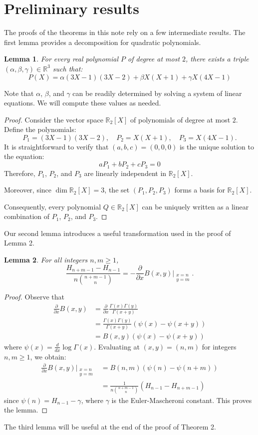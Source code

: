 \documentclass[10pt,a4paper]{amsart}
\numberwithin{equation}{section}
\newtheorem{lemma}{Lemma}
\newcommand{\R}{\mathbb R}
\begin{document}
\section{Preliminary results}
The proofs of the theorems in this note rely on a few intermediate results. The first lemma provides a decomposition for quadratic polynomials.
\begin{lemma}
    For every real polynomial $P$ of degree at most $2$, there exists a triple $(\alpha,\beta,\gamma)\in\R^3$ such that:
    \[P(X)=\alpha (3X-1)(3X-2)+\beta X(X+1)+\gamma X(4X-1)\]
\end{lemma}
Note that $\alpha$, $\beta$, and $\gamma$ can be readily determined by solving a system of linear equations. We will compute these values as needed. 
\begin{proof}
    Consider the vector space $\R_2[X]$ of polynomials of degree at most $2$. Define the polynomials:
    \[P_1=(3X-1)(3X-2),\quad P_2=X(X+1),\quad P_3=X(4X-1).\]
    It is straightforward to verify that $(a,b,c)=(0,0,0)$ is the unique solution to the equation:
    \[aP_1+bP_2+cP_3=0\]
    Therefore, $P_1$, $P_2$, and $P_3$ are linearly independent in $\R_2[X]$.
    
    Moreover, since $\dim\R_2[X]=3$, the set $(P_1,P_2,P_3)$ forms a basis for $\R_2[X]$. 

    Consequently, every polynomial $Q\in\R_2[X]$ can be uniquely written as a linear combination of $P_1$, $P_2$, and $P_3$.
\end{proof}
Our second lemma introduces a useful transformation used in the proof of Lemma 2.
\begin{lemma}
    For all integers $n,m\ge1$, 
    \begin{equation}
     \frac{H_{n+m-1}-H_{n-1}}{n\binom{n+m-1}{n}}=-\frac{\partial}{\partial x}B(x,y)\Bigg|_{\substack{x=n\\y=m}}.
    \label{lem2}
    \end{equation}
\end{lemma}
\begin{proof}
    Observe that
    \begin{align*}
        \frac{\partial}{\partial x}B(x,y)&=\frac{\partial}{\partial x}\frac{\Gamma(x)\Gamma(y)}{\Gamma(x+y)}\\&=\frac{\Gamma(x)\Gamma(y)}{\Gamma(x+y)}(\psi(x)-\psi(x+y))\\&=B(x,y)(\psi(x)-\psi(x+y))
    \end{align*}
    where $\psi(x)=\frac{d}{dx}\log{\Gamma(x)}$. Evaluating at $(x,y)=(n,m)$ for integers $n,m\ge1$, we obtain:
    \begin{align*}
        \frac{\partial}{\partial x}B(x,y)\Bigg|_{\substack{x=n\\y=m}}&=B(n,m)(\psi(n)-\psi(n+m))\\&=\frac{1}{n\binom{n+m-1}{n}}(H_{n-1}-H_{n+m-1})
    \end{align*}
    since $\psi(n)=H_{n-1}-\gamma$, where $\gamma$ is the Euler-Mascheroni constant. This proves the lemma.
\end{proof}
The third lemma will be useful at the end of the proof of Theorem 2.
\end{document}
